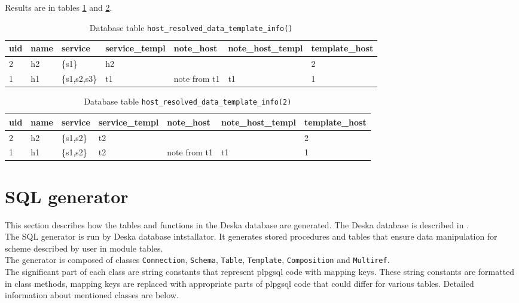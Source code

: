 \documentclass[deska]{subfiles}
\begin{document}
Results are in tables \ref{tab:multi-reshost} and \ref{tab:multi-reshostv2}.

\begin{longtable}{ l | l | l | l | l | l | l }
    \caption{Database table {\tt host\_resolved\_data\_template\_info()}}
    \label{tab:multi-reshost} \\
    uid &  name &  service &  service\_templ &  note\_host &  note\_host\_templ &  template\_host\\
    \hline
    \endhead
    2 & h2 & \{s1\} & h2 &  &  & 2\\
    1 & h1 & \{s1,s2,s3\} & t1 & note from t1 & t1 & 1\\
    \hline
\end{longtable}

\begin{longtable}{ l | l | l | l | l | l | l }
    \caption{Database table {\tt host\_resolved\_data\_template\_info(2)}}
    \label{tab:multi-reshostv2} \\
    uid &  name &  service &  service\_templ &  note\_host &  note\_host\_templ &  template\_host\\
    \hline
    \endhead
    2 & h2 & \{s1,s2\} & t2 &  &  & 2\\
    1 & h1 & \{s1,s2\} & t2 & note from t1 & t1 & 1\\
    \hline
\end{longtable}



\label{sec:sql-procedures}

\section{SQL generator}
\label{sec:sql-generator}
This section describes how the tables and functions in the Deska database are generated. The Deska database is described in .\\
The SQL generator is run by Deska database intstallator. It generates stored procedures and tables that ensure data manipulation for scheme described by user in module tables.\\

The generator is composed of classes {\tt Connection}, {\tt Schema}, {\tt Table}, {\tt Template}, {\tt Composition} and {\tt Multiref}.\\
The significant part of each class are string constants that represent plpgsql code with mapping keys. These string constants are formatted in class methods, mapping keys are replaced with appropriate parts of plpgsql code that could differ for various tables.
Detailed information about mentioned classes are below.
\end{document}
